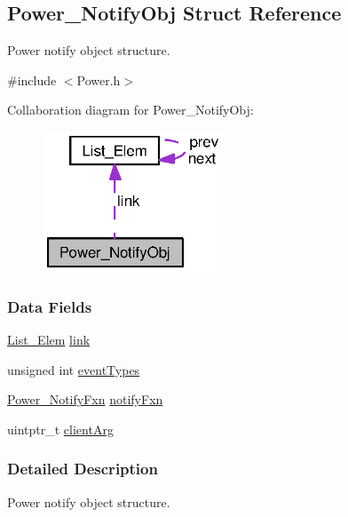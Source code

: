 \subsection{Power\+\_\+\+Notify\+Obj Struct Reference}
\label{struct_power___notify_obj}


Power notify object structure.  




{\ttfamily \#include $<$Power.\+h$>$}



Collaboration diagram for Power\+\_\+\+Notify\+Obj\+:
\nopagebreak
\begin{figure}[H]
\begin{center}
\leavevmode
\includegraphics[width=152pt]{struct_power___notify_obj__coll__graph}
\end{center}
\end{figure}
\subsubsection*{Data Fields}
\begin{DoxyCompactItemize}
\item 
\hyperlink{struct_list___elem}{List\+\_\+\+Elem} \hyperlink{struct_power___notify_obj_a0715ba7a7af18cd16286eeefa20252c0}{link}
\item 
unsigned int \hyperlink{struct_power___notify_obj_a9ca54b240450f2575f6f70e578c8b988}{event\+Types}
\item 
\hyperlink{_power_8h_a91335240b2081eeefec80d043030c857}{Power\+\_\+\+Notify\+Fxn} \hyperlink{struct_power___notify_obj_acfc434bbe72476fdac364ffe7df28f4c}{notify\+Fxn}
\item 
uintptr\+\_\+t \hyperlink{struct_power___notify_obj_ab430e61fc76f545d992c452a3bc74405}{client\+Arg}
\end{DoxyCompactItemize}


\subsubsection{Detailed Description}
Power notify object structure. 

